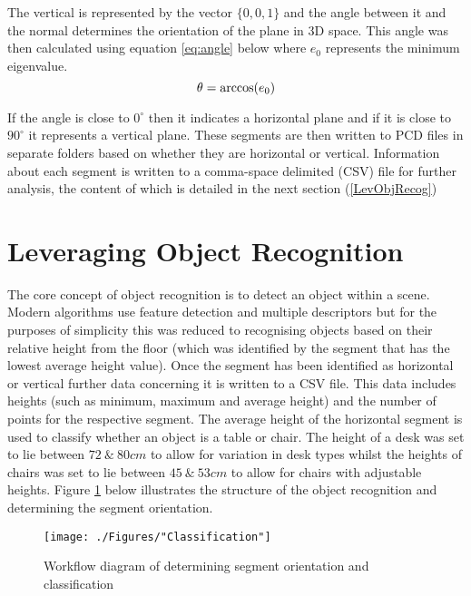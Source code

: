The vertical is represented by the vector $\{0,0,1\}$ and the angle between it and the normal determines the orientation of the plane in 3D space. This angle was then calculated using equation \ref{eq:angle} below where $e_0$ represents the minimum eigenvalue.
\vspace{-3mm}
\begin{equation}\label{eq:angle}
\theta = \arccos(e_0)
\vspace{-8mm}
\end{equation}

If the angle is close to $0^\circ$ then it indicates a horizontal plane and if it is close to $90^\circ$ it represents a vertical plane. These segments are then written to PCD files in separate folders based on whether they are horizontal or vertical. Information about each segment is written to a comma-space delimited (CSV) file for further analysis, the content of which is detailed in the next section (\ref{LevObjRecog})

\section{Leveraging Object Recognition \label{LevObjRecog}}
\vspace{-2mm}
The core concept of object recognition is to detect an object within a scene. Modern algorithms use feature detection and multiple descriptors but for the purposes of simplicity this was reduced to recognising objects based on their relative height from the floor (which was identified by the segment that has the lowest average height value). Once the segment has been identified as horizontal or vertical further data concerning it is written to a CSV file. This data includes heights (such as minimum, maximum and average height) and the number of points for the respective segment. The average height of the horizontal segment is used to classify whether an object is a table or chair. The height of a desk was set to lie between $72 \ \& \ 80cm$ to allow for variation in desk types whilst the heights of chairs was set to lie between  $45 \ \& \ 53cm$ to allow for chairs with adjustable heights. Figure \ref{classification} below illustrates the structure of the object recognition and determining the segment orientation.

\begin{figure}[h!]
	\centering
	\texttt{[image: ./Figures/"Classification"]}
	\caption{Workflow diagram of determining segment orientation and classification}
	\label{classification}
\end{figure}
\clearpage
